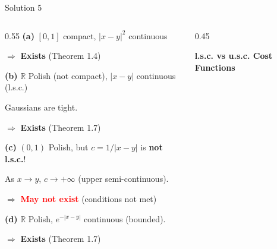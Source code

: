 \documentclass[aspectratio=169]{beamer}
\newcommand{\R}{\mathbb{R}}
\begin{document}
\begin{frame}{Solution 5}
\begin{columns}
\begin{column}{0.55\textwidth}
\textbf{(a)} $[0,1]$ compact, $|x-y|^2$ continuous

$\Rightarrow$ \textcolor{green!60!black}{\textbf{Exists}} (Theorem 1.4)

\vspace{0.3cm}
\textbf{(b)} $\R$ Polish (not compact), $|x-y|$ continuous (l.s.c.)

Gaussians are tight.

$\Rightarrow$ \textcolor{green!60!black}{\textbf{Exists}} (Theorem 1.7)

\vspace{0.3cm}
\textbf{(c)} $(0,1)$ Polish, but $c = 1/|x-y|$ is \textbf{not l.s.c.}!

As $x \to y$, $c \to +\infty$ (upper semi-continuous).

$\Rightarrow$ \textcolor{red}{\textbf{May not exist}} (conditions not met)

\vspace{0.3cm}
\textbf{(d)} $\R$ Polish, $e^{-|x-y|}$ continuous (bounded).

$\Rightarrow$ \textcolor{green!60!black}{\textbf{Exists}} (Theorem 1.7)
\end{column}
\begin{column}{0.45\textwidth}
\begin{center}
\textbf{l.s.c. vs u.s.c. Cost Functions}

\vspace{0.15cm}


\end{center}
\end{column}
\end{columns}
\end{frame}
\end{document}
